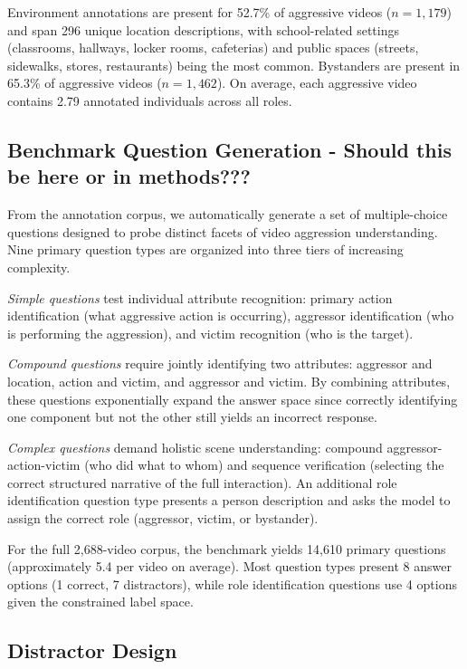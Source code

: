 Environment annotations are present for 52.7\% of aggressive videos ($n = 1,179$) and span 296 unique location descriptions, with school-related settings (classrooms, hallways, locker rooms, cafeterias) and public spaces (streets, sidewalks, stores, restaurants) being the most common.
Bystanders are present in 65.3\% of aggressive videos ($n = 1,462$).
On average, each aggressive video contains 2.79 annotated individuals across all roles.

\subsection{Benchmark Question Generation - Should this be here or in methods???}

From the annotation corpus, we automatically generate a set of multiple-choice questions designed to probe distinct facets of video aggression understanding.
Nine primary question types are organized into three tiers of increasing complexity.

\textit{Simple questions} test individual attribute recognition: primary action identification (what aggressive action is occurring), aggressor identification (who is performing the aggression), and victim recognition (who is the target).

\textit{Compound questions} require jointly identifying two attributes: aggressor and location, action and victim, and aggressor and victim.
By combining attributes, these questions exponentially expand the answer space since correctly identifying one component but not the other still yields an incorrect response.

\textit{Complex questions} demand holistic scene understanding: compound aggressor-action-victim (who did what to whom) and sequence verification (selecting the correct structured narrative of the full interaction).
An additional role identification question type presents a person description and asks the model to assign the correct role (aggressor, victim, or bystander).

For the full 2,688-video corpus, the benchmark yields 14,610 primary questions (approximately 5.4 per video on average).
Most question types present 8 answer options (1 correct, 7 distractors), while role identification questions use 4 options given the constrained label space.

\subsection{Distractor Design}

